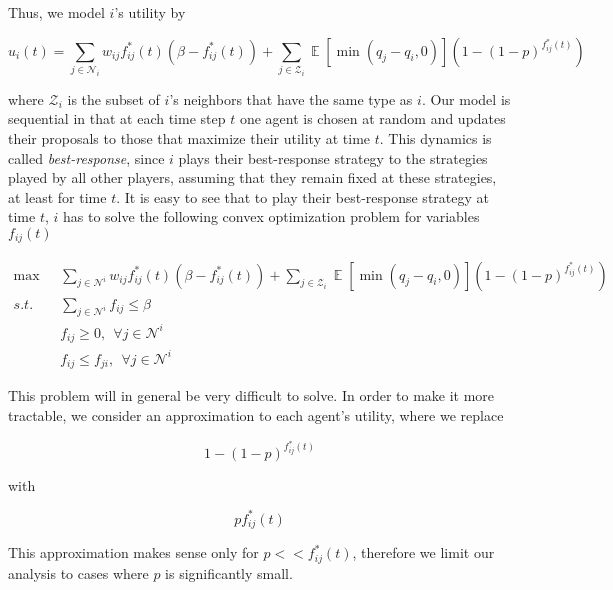\documentclass[format=acmsmall, review=false]{acmart}
\newcommand{\Ex}{\mathop{\mathbb{E}}}
\begin{document}
\par Thus, we model $i$'s utility by

\begin{equation}\label{eq:util}
u_i(t) = \sum_{j \in \mathcal{N}_i} {w_{ij} f^*_{ij}(t) \left( \beta - f^*_{ij}(t) \right) } +
\sum_{j \in \mathcal{Z}_i} {\Ex \left[ \min \left( q_j - q_i, 0 \right) \right] \left( 1 - {\left( 1 - p \right)}^{f^*_{ij}(t)} \right) }
\end{equation}

where $\mathcal{Z}_i$ is the subset of $i$'s neighbors that have the same type as $i$. Our model is sequential in that at each
time step $t$ one agent is chosen at random and updates their proposals to those that maximize their utility at time $t$.
This dynamics is called \textit{best-response}, since $i$ plays their best-response strategy to the strategies played by all
other players, assuming that they remain fixed at these strategies, at least for time $t$. It is easy to see that to play their
best-response strategy at time $t$, $i$ has to solve the following convex optimization problem for variables $f_{ij}(t)$

\begin{align}\label{eq:opt-prog}
\max & \: \: \: \sum_{j \in \mathcal{N}^i} {w_{ij} f^*_{ij}(t) \left( \beta - f^*_{ij}(t) \right) } +
\sum_{j \in \mathcal{Z}_i} {\Ex \left[ \min \left( q_j - q_i, 0 \right) \right] \left( 1 - {\left( 1 - p \right)}^{f^*_{ij}(t)} \right) } \\
s.t. & \: \: \: \sum_{j \in \mathcal{N}^i} {f_{ij}} \leq \beta \nonumber \\
& \: \: \: f_{ij} \geq 0, \: \: \forall j \in \mathcal{N}^i \nonumber \\
& \: \: \: f_{ij} \leq f_{ji}, \: \: \forall j \in \mathcal{N}^i \nonumber
\end{align}

\par This problem will in general be very difficult to solve. In order to make it more tractable, we consider an approximation
to each agent's utility, where we replace

\[
1 - {\left( 1 - p \right)}^{f^*_{ij}(t)}
\]

with 

\[
p f^*_{ij}(t)
\]

This approximation makes sense only for $p << f^*_{ij}(t)$, therefore we limit our analysis to cases where $p$ is significantly
small.
\end{document}
